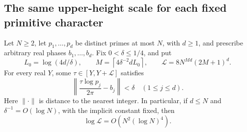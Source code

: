 \subsection{The same upper-height scale for each fixed primitive character}

\begin{lemma}
\label{lem:A051-inhomogeneous}
Let \(N\ge2\), let \(p_1,\ldots,p_d\) be distinct primes at most
\(N\), with \(d\ge1\), and prescribe arbitrary real phases
\(b_1,\ldots,b_d\). Fix \(0<\delta\le1/4\), and put
\[
 L_0=\log(4d/\delta),\qquad
 M=\left\lceil4\delta^{-2}dL_0\right\rceil,
 \qquad \mathcal L=8N^{Md}(2M+1)^d.
\]
For every real \(Y\), some \(\tau\in[Y,Y+\mathcal L]\) satisfies
\[
       \left\|\frac{\tau\log p_j}{2\pi}-b_j\right\|<\delta
                          \quad(1\le j\le d).
\]
Here \(\|\cdot\|\) is distance to the nearest integer. In particular,
if \(d\le N\) and \(\delta^{-1}=O(\log N)\), with the implicit
constant fixed, then
\[
                       \log\mathcal L=O(N^2(\log N)^4).
\]
\end{lemma}

